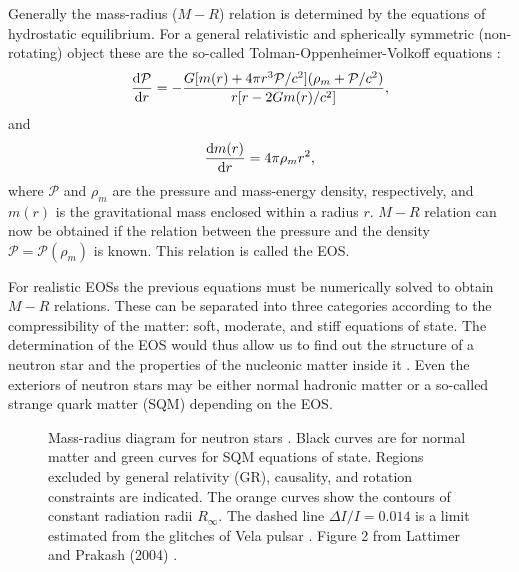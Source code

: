 \documentclass{wihuri}
\def\be{\begin{equation}}
\def\ee{\end{equation}}
\def\d{{\rm d}}
\begin{document}





Generally the mass-radius ($M-R$) relation is determined by the equations of hydrostatic equilibrium. For a general relativistic and spherically symmetric (non-rotating) object %
these are the so-called Tolman-Oppenheimer-Volkoff equations %
\cite{tolman}\cite{oppenheimer}:
\be
 \frac{\d \mathcal{P}}{\d r} = -\frac{G[m(r)+4 \pi r^{3}\mathcal{P}/c^{2}](\rho_{m} + \mathcal{P}/c^{2})}{r[r-2Gm(r)/c^{2}]},
\ee 
and
\be
 \frac{\d m(r)}{\d r } = 4 \pi \rho_{m} r^{2},
\ee
where $\mathcal{P}$ and $\rho_{m}$ are the pressure and mass-energy density, respectively, and $m(r)$ is the gravitational mass enclosed within a radius $r$. $M-R$ relation can now be obtained if the relation between the pressure and the density $\mathcal{P}=\mathcal{P}(\rho_{m})$ is known. This relation is called the EOS. 


For realistic EOSs the previous equations must be numerically solved to obtain $M-R$ relations. These can be separated into three categories according to the compressibility of the matter: soft, moderate, and stiff equations of state. The determination of the EOS would thus allow us to find out the structure of a neutron star and the properties of the nucleonic matter inside it \cite{akmal}. Even the exteriors of neutron stars may be either normal hadronic matter or a so-called strange quark matter (SQM) depending on the EOS.  

\begin{figure}
\centerline{} 
\caption{Mass-radius diagram for neutron stars \cite{lattimer}. Black curves are for normal matter and green curves for SQM equations of state. Regions excluded by general relativity (GR), causality, and rotation constraints are indicated. The orange curves show the contours of constant radiation radii $R_{\infty}$. The dashed line $\Delta I / I = 0.014$ is a limit estimated from the glitches of Vela pulsar \cite{lattimer2001}. Figure 2 from Lattimer and Prakash (2004) \cite{lattimer}.}  
\label{fig:eos_mr}
\end{figure}
\end{document}
